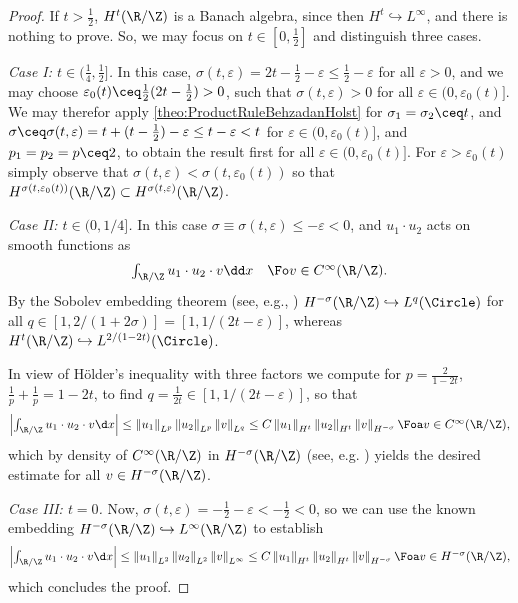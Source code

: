\begin{proof}
    If $ t>\frac{1}{2} $, $ H^{t}(\R/\Z) $ is a Banach algebra, since then $ H^{t}\hookrightarrow L^\infty $, and there is nothing to prove. So, we may focus on $ t\in[0,\frac{1}{2}] $ and distinguish three cases. 

    \textit{{Case I:} $t \in (\frac{1}{4},\frac12]$.}
    In this case, $ \sigma(t,\varepsilon)=2t-\frac{1}{2}-\varepsilon\le \frac{1}{2}-\varepsilon $ for all $ \varepsilon>0 $, and we may choose $ \varepsilon_{0}(t)\ceq\frac{1}{2}(2t-\frac{1}{2})>0 $, such that $ \sigma(t,\varepsilon)>0 $ for all $ \varepsilon\in (0,\varepsilon_{0}(t)] $. We may therefor apply \cref{theo:ProductRuleBehzadanHolst} for $ \sigma_{1}=\sigma_2\ceq t $, and $ \sigma\ceq \sigma(t,\varepsilon)=t+(t-\frac{1}{2})-\varepsilon \le t-\varepsilon<t$ for $  \varepsilon\in (0,\varepsilon_{0}(t)] $, and $ p_1=p_2=p\ceq 2 $, to obtain the result first for all $  \varepsilon\in (0,\varepsilon_{0}(t)] $. For $ \varepsilon>\varepsilon_{0}(t) $ simply observe that $ \sigma(t,\varepsilon) <\sigma(t,\varepsilon_{0}(t))$ so that $ H^{\sigma(t,\varepsilon_{0}(t))}(\R/\Z)\subset H^{\sigma(t,\varepsilon)}(\R/\Z) $. 

    \textit{{Case II:} $ t \in  (0,1/4]$.}
    In this case $ \sigma\equiv\sigma(t,\varepsilon)\le -\varepsilon <0$, and $ u_1\cdot u_2 $ acts on smooth functions as 
    \[\textstyle\int_{\R/\Z}u_1\cdot u_2\cdot v\dd x\quad \Fo v\in C^\infty(\R/\Z).\]
    By the Sobolev embedding theorem (see, e.g., \cite[Theorem 2.3.4]{AgranovichSobolevSpaces2015})
    $ H^{-\sigma}(\R/\Z)\hookrightarrow L^{q}(\Circle) $ for all $ q\in [1,2/(1+2\sigma)]= [1,1/(2t-\varepsilon)]$, whereas $ H^{t}(\R/\Z)\hookrightarrow L^{2/(1-2t)} (\Circle)$. 

    In view of Hölder's inequality with three factors we compute for $ p=\frac{2}{1-2t} $, $ \frac{1}{p}+\frac{1}{p}=1-2t $, to find $ q=\frac{1}{2t}\in [1,1/(2t-\varepsilon)]$, so that 
    \begin{align*}\textstyle
        \left|\int_{\R/\Z}u_1\cdot u_2\cdot v\d x \right|\le \left\|u_1 \right\|_{L^p}\left\|u_2 \right\|_{L^p}\left\|v \right\|_{L^q}\le C \left\|u_1 \right\|_{H^t}\left\|u_2 \right\|_{H^t}\left\|v \right\|_{H^{-\sigma}}\Foa v\in C^\infty(\R/\Z),
    \end{align*}
    which by density of $ C^\infty(\R/\Z) $ in $ H^{-\sigma}(\R/\Z) $ (see, e.g. \cite[Statement 4 in Section 2.3]{AgranovichSobolevSpaces2015}) yields the desired estimate for all $ v\in H^{-\sigma}(\R/\Z) $.

    \textit{{Case III:} $t=0$.}
    Now, $ \sigma(t,\varepsilon)=-\frac{1}{2}-\varepsilon <-\frac{1}{2}<0$, so we can use the known embedding $ H^{-\sigma}(\R/\Z)\hookrightarrow L^\infty(\R/\Z) $ to establish 
    \begin{align*}\textstyle
        \left|\int_{\R/\Z}u_1\cdot u_2\cdot v\d x \right|\le \left\|u_1 \right\|_{L^2}\left\|u_2 \right\|_{L^2}\left\|v \right\|_{L^\infty}\le C \left\|u_1 \right\|_{H^t}\left\|u_2 \right\|_{H^t}\left\|v \right\|_{H^{-\sigma}}\Foa v\in H^{-\sigma}(\R/\Z),
    \end{align*}
    which concludes the proof. 
\end{proof}
